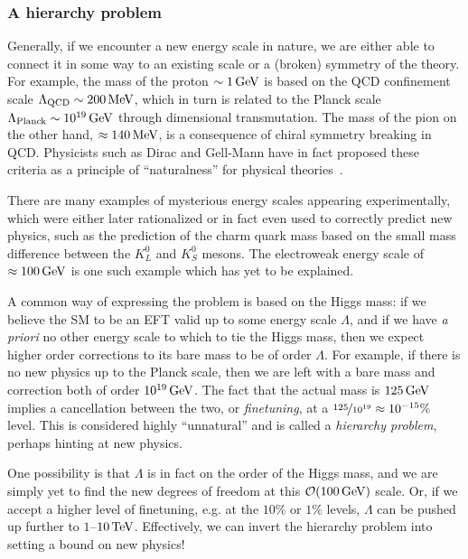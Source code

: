 \subsubsection{A hierarchy problem}

Generally, if we encounter a new energy scale in nature, we are either able to connect it in some way to an existing scale or a (broken) symmetry of the theory.
For example, the mass of the proton $\sim 1\,\text{Ge\hspace{-.08em}V}$ is based on the QCD confinement scale $\Lambda_{\text{QCD}} \sim 200\,\text{Me\hspace{-.08em}V}$, which in turn is related to the Planck scale $\Lambda_{\text{Planck}} \sim 10^{19}\,\text{Ge\hspace{-.08em}V}$ through dimensional transmutation.
The mass of the pion on the other hand, $\approx 140\,\text{Me\hspace{-.08em}V}$, is a consequence of chiral symmetry breaking in QCD.
Physicists such as Dirac and Gell-Mann have in fact proposed these criteria as a principle of ``naturalness'' for physical theories~\cite{Dirac:1938mt, Gell-Mann:1956iqa}.

There are many examples of mysterious energy scales appearing experimentally, which were either later rationalized or in fact even used to correctly predict new physics, such as the prediction of the charm quark mass based on the small mass difference between the $K_L^0$ and $K_S^0$ mesons.
The electroweak energy scale of $\approx 100\,\text{Ge\hspace{-.08em}V}$ is one such example which has yet to be explained.

A common way of expressing the problem is based on the Higgs mass: if we believe the SM to be an EFT valid up to some energy scale $\Lambda$, and if we have \textit{a priori} no other energy scale to which to tie the Higgs mass, then we expect higher order corrections to its bare mass to be of order $\Lambda$.
For example, if there is no new physics up to the Planck scale, then we are left with a bare mass and correction both of order $10^{19} \,\text{Ge\hspace{-.08em}V}$.
The fact that the actual mass is $125 \,\text{Ge\hspace{-.08em}V}$ implies a cancellation between the two, or \textit{finetuning}, at a $\cnicefrac{125}{10^{19}} \approx 10^{-15}\%$ level.
This is considered highly ``unnatural'' and is called a \textit{hierarchy problem}, perhaps hinting at new physics.

One possibility is that $\Lambda$ is in fact on the order of the Higgs mass, and we are simply yet to find the new degrees of freedom at this $\mathcal O(100\,\text{Ge\hspace{-.08em}V})$ scale.
Or, if we accept a higher level of finetuning, e.g. at the $10\%$ or $1\%$ levels, $\Lambda$ can be pushed up further to $1$--$10\,\text{Te\hspace{-.08em}V}$.
Effectively, we can invert the hierarchy problem into setting a bound on new physics!

